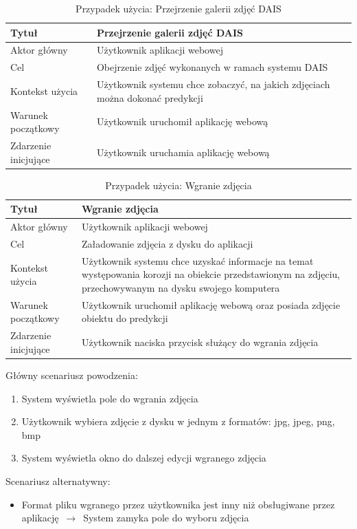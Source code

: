 \documentclass[polish,12pt]{aghthesis}
\begin{document}
\newpage
\begin{table}[h!]
\centering
 \begin{tabular}{|m{4cm}|m{11cm}|} 
 \hline
 Tytuł & Przejrzenie galerii zdjęć DAIS\\
 \hline
 Aktor główny & Użytkownik aplikacji webowej\\
 \hline
 Cel & Obejrzenie zdjęć wykonanych w ramach systemu DAIS\\ 
 \hline
 Kontekst użycia & Użytkownik systemu chce zobaczyć, na jakich zdjęciach można dokonać predykcji\\ 
 \hline
 Warunek początkowy & Użytkownik uruchomił aplikację webową\\
 \hline
 Zdarzenie inicjujące & Użytkownik uruchamia aplikację webową\\
 \hline
\end{tabular}
\caption{Przypadek użycia: Przejrzenie galerii zdjęć DAIS}
\label{table:2}
\end{table}

\begin{table}[h!]
\centering
 \begin{tabular}{|m{4cm}|m{11cm}|} 
 \hline
 Tytuł & Wgranie zdjęcia\\
 \hline
 Aktor główny & Użytkownik aplikacji webowej\\
 \hline
 Cel & Załadowanie zdjęcia z dysku do aplikacji\\ 
 \hline
 Kontekst użycia & Użytkownik systemu chce uzyskać informacje na temat występowania korozji na obiekcie przedstawionym na zdjęciu, przechowywanym na dysku swojego komputera\\ 
 \hline
 Warunek początkowy & Użytkownik uruchomił aplikację webową oraz posiada zdjęcie obiektu do predykcji\\
 \hline
 Zdarzenie inicjujące & Użytkownik naciska przycisk służący do wgrania zdjęcia\\
 \hline
\end{tabular}
\caption{Przypadek użycia: Wgranie zdjęcia}
\label{table:3}
\end{table}

\noindent
Główny scenariusz powodzenia:
\begin{enumerate}
    \item System wyświetla pole do wgrania zdjęcia
    \item Użytkownik wybiera zdjęcie z dysku w jednym z formatów: jpg, jpeg, png, bmp
    \item System wyświetla okno do dalszej edycji wgranego zdjęcia
\end{enumerate}
Scenariusz alternatywny:
\begin{itemize}
    \item Format pliku wgranego przez użytkownika jest inny niż obsługiwane przez aplikację $\,\to\,$ System zamyka pole do wyboru zdjęcia
\end{itemize}
\end{document}
